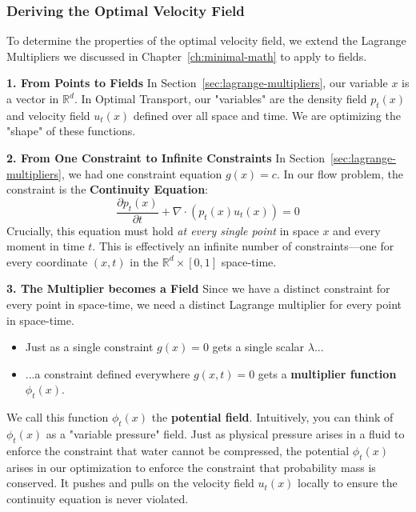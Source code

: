 \documentclass{book}
\begin{document}
\subsubsection{Deriving the Optimal Velocity Field}
To determine the properties of the optimal velocity field, we extend the Lagrange Multipliers we discussed in Chapter~\ref{ch:minimal-math} to apply to fields.

\textbf{1. From Points to Fields}
In Section~\ref{sec:lagrange-multipliers}, our variable $x$ is a vector in $\mathbb{R}^d$. In Optimal Transport, our "variables" are the density field $p_t(x)$ and velocity field $u_t(x)$ defined over all space and time. We are optimizing the "shape" of these functions.

\textbf{2. From One Constraint to Infinite Constraints}
In Section~\ref{sec:lagrange-multipliers}, we had one constraint equation $g(x) = c$. In our flow problem, the constraint is the \textbf{Continuity Equation}:
\begin{equation}
\frac{\partial p_t(x)}{\partial t} + \nabla \cdot (p_t(x) u_t(x)) = 0
\end{equation}
Crucially, this equation must hold \textit{at every single point} in space $x$ and every moment in time $t$. This is effectively an infinite number of constraints—one for every coordinate $(x, t)$ in the $\mathbb{R}^d \times [0,1]$ space-time.

\textbf{3. The Multiplier becomes a Field}
Since we have a distinct constraint for every point in space-time, we need a distinct Lagrange multiplier for every point in space-time.
\begin{itemize}
    \item Just as a single constraint $g(x)=0$ gets a single scalar $\lambda$...
    \item ...a constraint defined everywhere $g(x,t)=0$ gets a \textbf{multiplier function} $\phi_t(x)$.
\end{itemize}

We call this function $\phi_t(x)$ the \textbf{potential field}. Intuitively, you can think of $\phi_t(x)$ as a "variable pressure" field. Just as physical pressure arises in a fluid to enforce the constraint that water cannot be compressed, the potential $\phi_t(x)$ arises in our optimization to enforce the constraint that probability mass is conserved. It pushes and pulls on the velocity field $u_t(x)$ locally to ensure the continuity equation is never violated.
\end{document}
